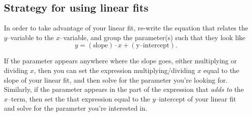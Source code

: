 \documentclass[10pt,letterpaper,twoside]{article}
\begin{document}
\subsection{Strategy for using linear fits}
In order to take advantage of your linear fit, re-write the equation that relates the $y$--variable to the $x$--variable, and group the parameter(s) such that they look like
\begin{equation}
	y=(\mathrm{slope})\cdot x + (\text{y--intercept}).
\end{equation}

If the parameter appears anywhere where the slope goes, either multiplying or dividing $x$, then you can set the expression multiplying/dividing $x$ equal to the slope of your linear fit, and then solve for the parameter you're looking for.
Similarly, if the parameter appears in the part of the expression that \textit{adds to} the $x$--term, then set the that expression equal to the $y$--intercept of your linear fit and solve for the parameter you're interested in.
\end{document}
